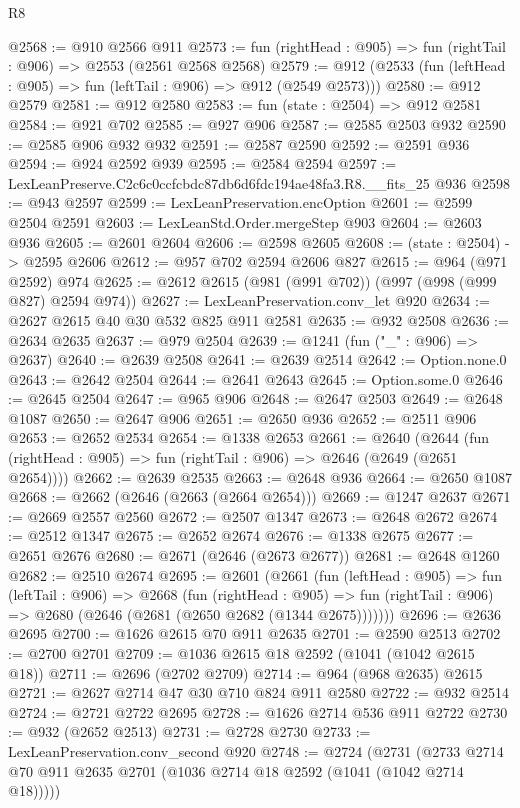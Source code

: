\begin{lexlean}{R8}
\begin{coremodule}
@2568 := @910 @2566 @911
@2573 := fun (rightHead : @905) => fun (rightTail : @906) => @2553 (@2561 @2568 @2568)
@2579 := @912 (@2533 (fun (leftHead : @905) => fun (leftTail : @906) => @912 (@2549 @2573)))
@2580 := @912 @2579
@2581 := @912 @2580
@2583 := fun (state : @2504) => @912 @2581
@2584 := @921 @702
@2585 := @927 @906
@2587 := @2585 @2503 @932
@2590 := @2585 @906 @932 @932
@2591 := @2587 @2590
@2592 := @2591 @936
@2594 := @924 @2592 @939
@2595 := @2584 @2594
@2597 := LexLeanPreserve.C2c6c0ccfcbdc87db6d6fdc194ae48fa3.R8.__fits_25 @936
@2598 := @943 @2597
@2599 := LexLeanPreservation.encOption
@2601 := @2599 @2504 @2591
@2603 := LexLeanStd.Order.mergeStep @903
@2604 := @2603 @936
@2605 := @2601 @2604
@2606 := @2598 @2605
@2608 := (state : @2504) -> @2595 @2606
@2612 := @957 @702 @2594 @2606 @827
@2615 := @964 (@971 @2592) @974
@2625 := @2612 @2615 (@981 (@991 @702)) (@997 (@998 (@999 @827) @2594 @974))
@2627 := LexLeanPreservation.conv_let @920
@2634 := @2627 @2615 @40 @30 @532 @825 @911 @2581
@2635 := @932 @2508
@2636 := @2634 @2635
@2637 := @979 @2504
@2639 := @1241 (fun ("_" : @906) => @2637)
@2640 := @2639 @2508
@2641 := @2639 @2514
@2642 := Option.none.{0}
@2643 := @2642 @2504
@2644 := @2641 @2643
@2645 := Option.some.{0}
@2646 := @2645 @2504
@2647 := @965 @906
@2648 := @2647 @2503
@2649 := @2648 @1087
@2650 := @2647 @906
@2651 := @2650 @936
@2652 := @2511 @906
@2653 := @2652 @2534
@2654 := @1338 @2653
@2661 := @2640
    (@2644 (fun (rightHead : @905) => fun (rightTail : @906) => @2646 (@2649 (@2651 @2654))))
@2662 := @2639 @2535
@2663 := @2648 @936
@2664 := @2650 @1087
@2668 := @2662 (@2646 (@2663 (@2664 @2654)))
@2669 := @1247 @2637
@2671 := @2669 @2557 @2560
@2672 := @2507 @1347
@2673 := @2648 @2672
@2674 := @2512 @1347
@2675 := @2652 @2674
@2676 := @1338 @2675
@2677 := @2651 @2676
@2680 := @2671 (@2646 (@2673 @2677))
@2681 := @2648 @1260
@2682 := @2510 @2674
@2695 := @2601
    (@2661
      (fun (leftHead : @905) =>
      fun (leftTail : @906) =>
      @2668
        (fun (rightHead : @905) =>
        fun (rightTail : @906) => @2680 (@2646 (@2681 (@2650 @2682 (@1344 @2675)))))))
@2696 := @2636 @2695
@2700 := @1626 @2615 @70 @911 @2635
@2701 := @2590 @2513
@2702 := @2700 @2701
@2709 := @1036 @2615 @18 @2592 (@1041 (@1042 @2615 @18))
@2711 := @2696 (@2702 @2709)
@2714 := @964 (@968 @2635) @2615
@2721 := @2627 @2714 @47 @30 @710 @824 @911 @2580
@2722 := @932 @2514
@2724 := @2721 @2722 @2695
@2728 := @1626 @2714 @536 @911 @2722
@2730 := @932 (@2652 @2513)
@2731 := @2728 @2730
@2733 := LexLeanPreservation.conv_second @920
@2748 := @2724
    (@2731 (@2733 @2714 @70 @911 @2635 @2701 (@1036 @2714 @18 @2592 (@1041 (@1042 @2714 @18)))))

\end{coremodule}
\end{lexlean}
